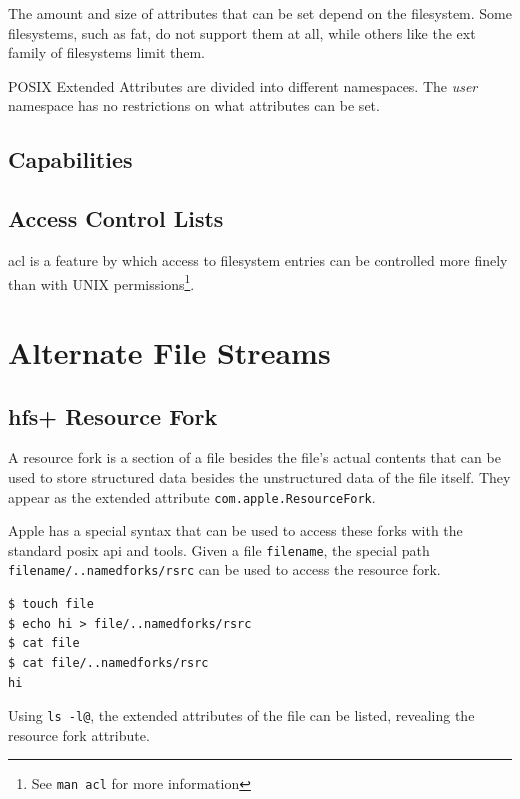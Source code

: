 \documentclass[a4paper]{article}
\begin{document}

The amount and size of attributes that can be set depend on the filesystem. Some filesystems, such as \gls{fat}, do not support them at all, while others like the \gls{ext} family of filesystems limit them.

POSIX Extended Attributes are divided into different namespaces. The \emph{user} namespace has no restrictions on what attributes can be set. 

\subsection{Capabilities}

\subsection{Access Control Lists}

\gls{acl} is a feature by which access to filesystem entries can be controlled more finely than with UNIX permissions\footnote{See \texttt{man acl} for more information}.


\section{Alternate File Streams}

\subsection{\gls{hfs+} Resource Fork}

A resource fork is a section of a file besides the file's actual contents that can be used to store structured data besides the unstructured data of the file itself. They appear as the extended attribute \verb|com.apple.ResourceFork|. 

Apple has a special syntax that can be used to access these forks with the standard \gls{posix} \gls{api} and tools. Given a file \verb|filename|, the special path \verb|filename/..namedforks/rsrc| can be used to access the resource fork.

\begin{verbatim}
$ touch file
$ echo hi > file/..namedforks/rsrc
$ cat file
$ cat file/..namedforks/rsrc
hi  
\end{verbatim}

Using \verb|ls -l@|, the extended attributes of the file can be listed, revealing the resource fork attribute.
\end{document}
